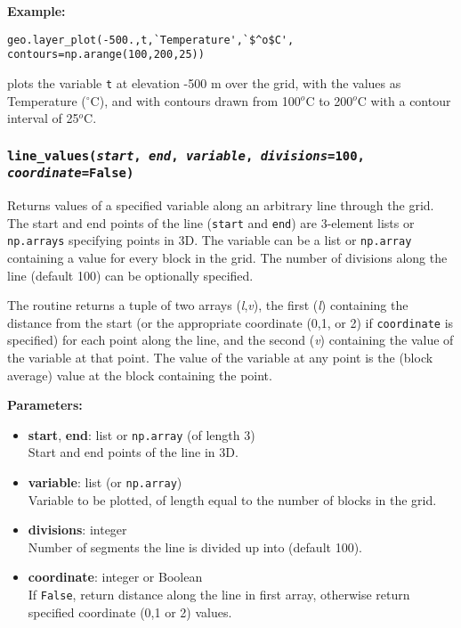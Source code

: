 \textbf{Example:}

\begin{verbatim}
geo.layer_plot(-500.,t,`Temperature',`$^o$C', contours=np.arange(100,200,25))
\end{verbatim}

plots the variable \texttt{t} at elevation -500 m over the grid, with the values as Temperature ($^{\circ}$C), and with contours drawn from 100$^o$C to 200$^o$C with a contour interval of 25$^o$C.

\subsubsection{\texttt{line\_values(\emph{start}, \emph{end}, \emph{variable}, \emph{divisions}=100, \emph{coordinate}=\texttt{False})}}

Returns values of a specified variable along an arbitrary line through the grid.  The start and end points of the line (\texttt{start} and \texttt{end}) are 3-element lists or \texttt{np.arrays} specifying points in 3D.  The variable can be a list or \texttt{np.array} containing a value for every block in the grid.  The number of divisions along the line (default 100) can be optionally specified.

The routine returns a tuple of two arrays (\emph{l},\emph{v}), the first (\emph{l}) containing the distance from the start (or the appropriate coordinate (0,1, or 2) if \texttt{coordinate} is specified) for each point along the line, and the second (\emph{v}) containing the value of the variable at that point.  The value of the variable at any point is the (block average) value at the block containing the point.

\textbf{Parameters:}
\begin{itemize}
\item \textbf{start}, \textbf{end}: list or \texttt{np.array} (of length 3)\\
  Start and end points of the line in 3D.
\item \textbf{variable}: list (or \texttt{np.array})\\
  Variable to be plotted, of length equal to the number of blocks in the grid.
\item \textbf{divisions}: integer\\
  Number of segments the line is divided up into (default 100).
\item \textbf{coordinate}: integer or Boolean\\
  If \texttt{False}, return distance along the line in first array, otherwise return specified coordinate (0,1 or 2) values.
\end{itemize}

